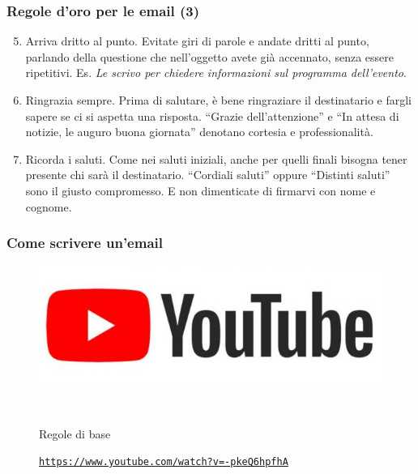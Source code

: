 \documentclass[]{beamer}
\begin{document}
\begin{frame}
\frametitle{Regole d'oro per le email (3)}
\begin{enumerate}\setcounter{enumi}{4}
  \item \alert{Arriva dritto al punto.} Evitate giri di parole e andate dritti al punto, parlando della questione che nell’oggetto avete già accennato, senza essere ripetitivi. Es. \emph{Le scrivo per chiedere informazioni sul programma dell’evento}.\pause
  \item \alert{Ringrazia sempre.} Prima di salutare, è bene ringraziare il destinatario e fargli sapere se ci si aspetta una risposta. ``Grazie dell’attenzione'' e ``In attesa di notizie, le auguro buona giornata'' denotano cortesia e professionalità.\pause
  \item \alert{Ricorda i saluti.} Come nei saluti iniziali, anche per quelli finali bisogna tener presente chi sarà il destinatario. ``Cordiali saluti'' oppure ``Distinti saluti'' sono il giusto compromesso. E non dimenticate di firmarvi con nome e cognome.
\end{enumerate}
\end{frame}





\begin{frame}
\frametitle{Come scrivere un'email}
\begin{figure}
  \includegraphics[width=.5\columnwidth]{img/ytlogo.jpg}
  
  ~
  
  Regole di base
  
  \href{https://www.youtube.com/watch?v=-pkeQ6hpfhA}{\texttt{https://www.youtube.com/watch?v=-pkeQ6hpfhA}}
\end{figure}
\end{frame}
\end{document}

